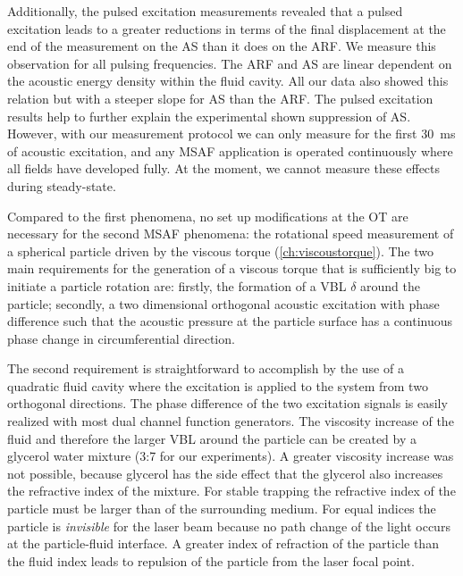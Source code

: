 Additionally, the pulsed excitation measurements revealed that a pulsed 
excitation leads to a greater reductions in terms of the final displacement at 
the end of the measurement on the AS than it does on the ARF. We measure this 
observation for all pulsing frequencies. The ARF and AS are linear dependent on 
the acoustic energy density within the fluid cavity. All our data also showed 
this relation but with a steeper slope for AS than the ARF. The pulsed 
excitation results help to further explain the experimental shown suppression 
of AS. However, with our measurement protocol we can only measure for the first 
\SI{30}{\ms} of acoustic excitation, and any MSAF application is operated 
continuously where all fields have developed fully. At the moment, we cannot 
measure these effects during steady-state.


Compared to the first phenomena, no set up modifications at the OT are 
necessary for the second MSAF phenomena: the rotational speed measurement of a 
spherical particle driven by the viscous torque (\cref{ch:viscoustorque}). The 
two main requirements for the generation of a viscous torque that is 
sufficiently big to initiate a particle rotation are: firstly, the formation of 
a VBL $\delta$ around the particle; secondly, a two 
dimensional orthogonal acoustic excitation with phase difference such that the 
acoustic pressure at the particle surface has a continuous phase change in 
circumferential direction.

The second requirement is straightforward to accomplish by the use of a 
quadratic fluid cavity where the excitation is applied to the system from two 
orthogonal directions. The phase difference of the two excitation signals is 
easily realized with most dual channel function generators. The viscosity 
increase of the fluid and therefore the larger VBL around 
the particle can be created by a glycerol water mixture (3:7 for our 
experiments). A greater viscosity increase was not possible, because glycerol 
has the side effect that the glycerol also increases the refractive index of 
the mixture. For stable trapping the refractive index of the particle must be 
larger than of the surrounding medium. For equal indices the particle is 
\emph{invisible} for the laser beam because no path change of the light occurs 
at the particle-fluid interface. A greater index of refraction of the particle 
than the fluid index leads to repulsion of the particle from the laser focal 
point.

